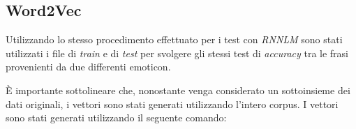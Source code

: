 \documentclass[a4paper,12pt,openright,twoside]{report}
\theoremstyle{definition}
\begin{document}

\subsection{Word2Vec}
\label{sss:word2vec}
Utilizzando lo stesso procedimento effettuato per i test con \emph{RNNLM} sono stati utilizzati i file di \emph{train} e di \emph{test}
per svolgere gli stessi test di \emph{accuracy} tra le frasi provenienti da due differenti emoticon.

\`E importante sottolineare che, nonostante venga considerato un sottoinsieme dei dati originali, i vettori sono stati generati utilizzando 
l'intero corpus. I vettori sono stati generati utilizzando il seguente comando:
\end{document}
